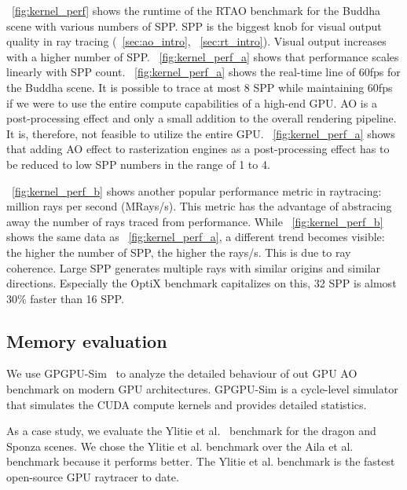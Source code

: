 ~\autoref{fig:kernel_perf} shows the runtime of the RTAO benchmark for the Buddha scene with various numbers of SPP. SPP is the biggest knob for visual output quality in ray tracing (~\autoref{sec:ao_intro}, ~\autoref{sec:rt_intro}). Visual output increases with a higher number of SPP. ~\autoref{fig:kernel_perf_a} shows that performance scales linearly with SPP count. 
~\autoref{fig:kernel_perf_a} shows the real-time line of 60fps for the Buddha scene. It is possible to trace at most 8 SPP while maintaining 60fps if we were to use the entire compute capabilities of a high-end GPU. AO is a post-processing effect and only a small addition to the overall rendering pipeline. It is, therefore, not feasible to utilize the entire GPU. ~\autoref{fig:kernel_perf_a} shows that adding AO effect to rasterization engines as a post-processing effect has to be reduced to low SPP numbers in the range of 1 to 4.

~\autoref{fig:kernel_perf_b} shows another popular performance metric in raytracing: million rays per second (MRays/s). This metric has the advantage of abstracing away the number of rays traced from performance. While ~\autoref{fig:kernel_perf_b} shows the same data as ~\autoref{fig:kernel_perf_a}, a different trend becomes visible: the higher the number of SPP, the higher the rays/s. This is due to ray coherence. Large SPP generates multiple rays with similar origins and similar directions. Especially the OptiX benchmark capitalizes on this, 32 SPP is almost 30\% faster than 16 SPP. 


\subsection{Memory evaluation}

We use GPGPU-Sim~\cite{4919648} to analyze the detailed behaviour of out GPU AO benchmark on modern GPU architectures. 
GPGPU-Sim is a cycle-level simulator that simulates the CUDA compute kernels and provides detailed statistics.

As a case study, we evaluate the Ylitie et al.~\cite{Ylitie:2017:EIR:3105762.3105773} benchmark for the dragon and Sponza scenes. We chose the Ylitie et al. benchmark over the Aila et al. benchmark because it performs better. The Ylitie et al. benchmark is the fastest open-source GPU raytracer to date.

